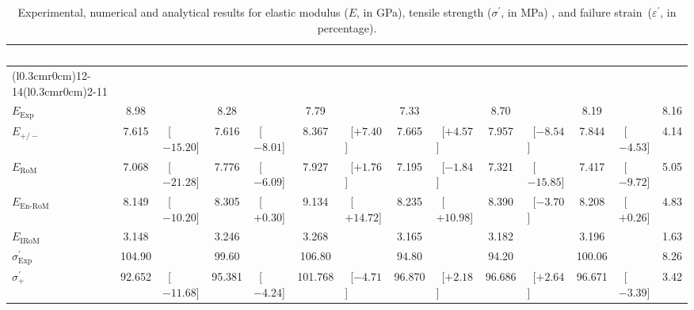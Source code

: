 	
\begin{table}[!t]
\centering\scriptsize
\def\GPa{{\scriptsize (GPa)}}
\caption{Experimental, numerical and analytical results for elastic modulus ($E$, in GPa), tensile strength ($\sigma^\prime$, in MPa) , and failure strain~($\varepsilon^\prime$, in percentage).}\label{table:results}
\begin{tabular}{p{}@{}*{5}{@{}S@{}>{\scriptsize\,}l@{}}@{}S@{}>{\scriptsize\,}l@{}@{}S@{}}
	\toprule
	   &                                                                                                                        &                                  \\
	\cmidrule(l{0.3cm}r{0cm}){12-14}\cmidrule(l{0.3cm}r{0cm}){2-11} &  &  &  &  &  &  & {} \\ \toprule
	$E_\text{Exp}$                  & 8.98    &                 & 8.28    &               & 7.79    &              & 7.33    &              & 8.70    &              & 8.19    &              & 8.16             \\
	$E_{+/-}$                       & 7.615   & [$-15.20$]      & 7.616   & [$-8.01$]     & 8.367   &   [$+7.40$]  & 7.665   & [$+4.57$]    & 7.957   & [$-8.54$]    & 7.844   & [$-4.53$]    & 4.14      \\
	$E_\text{RoM}$                  & 7.068   & [$-21.28$]      & 7.776   & [$-6.09$]     & 7.927   &  [$+1.76$]   & 7.195   & [$-1.84$]    & 7.321   &  [$-15.85$]  & 7.417   &  [$-9.72$]   & 5.05      \\
	$E_\text{En-RoM}$               & 8.149   & [$-10.20$]      & 8.305   & [$+0.30$]     & 9.134   & [$+14.72$]   & 8.235   & [$+10.98$]   & 8.390   & [$-3.70$]    & 8.208   & [$+0.26$]    & 4.83   \\ 
	$E_\text{IRoM}$                 & 3.148   &                 & 3.246   &               & 3.268   &              & 3.165   &              & 3.182   &              & 3.196   &              & 1.63             \\\midrule
	$\sigma^\prime_\text{Exp}$      & 104.90  &                 & 99.60   &               & 106.80  &              & 94.80   &              & 94.20   &              & 100.06  &              & 8.26              \\
	$\sigma^\prime_{+}$             & 92.652  & [$-11.68$]      & 95.381  & [$-4.24$]     & 101.768 &  [$-4.71$]   & 96.870  & [$+2.18$]    & 96.686  &  [$+2.64$]   & 96.671  &  [$-3.39$]   & 3.42         \\

\end{tabular}
\end{table}
